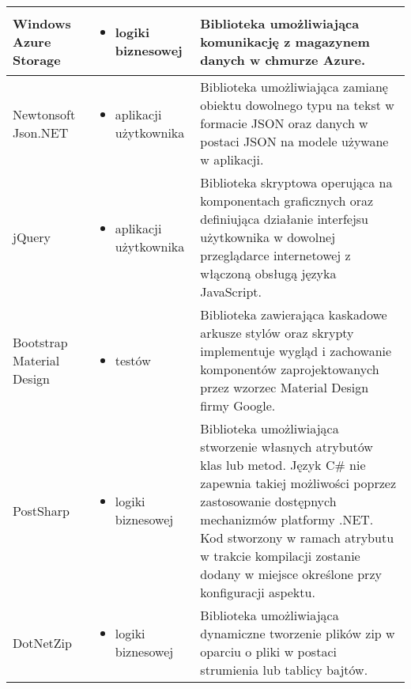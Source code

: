 \begin{center}
\begin{longtable}{ | p{2.2cm} | p{5cm} | p{6.5cm} |}
    \hline Windows Azure Storage &  
    \begin{itemize} 
    	\item logiki biznesowej
    \end{itemize} 
    & Biblioteka umożliwiająca komunikację z magazynem danych w chmurze Azure.\\ \hline
    
        \hline Newtonsoft Json.NET  &
        \begin{itemize} 
   			 \item aplikacji użytkownika
   		 \end{itemize}
    & Biblioteka umożliwiająca zamianę obiektu dowolnego typu  na tekst w formacie JSON oraz danych w postaci JSON na modele używane w aplikacji.		\\ \hline
    
    \hline jQuery &  
    \begin{itemize} 
    	\item aplikacji użytkownika
    \end{itemize} 
    & Biblioteka skryptowa operująca na komponentach graficznych oraz definiująca działanie interfejsu użytkownika w dowolnej przeglądarce internetowej z włączoną obsługą języka JavaScript. \\ \hline
    
    
    \hline Bootstrap Material Design &  
    \begin{itemize} 
    	\item testów
    \end{itemize} 
    & Biblioteka zawierająca kaskadowe arkusze stylów oraz skrypty implementuje wygląd i zachowanie komponentów zaprojektowanych przez wzorzec Material Design firmy Google. \\ \hline
    
    
    \hline PostSharp &  
    \begin{itemize} 
    	\item logiki biznesowej
    \end{itemize} 
    & Biblioteka umożliwiająca stworzenie własnych atrybutów klas lub metod. Język C\# nie zapewnia takiej możliwości poprzez zastosowanie dostępnych mechanizmów platformy .NET. Kod stworzony w ramach atrybutu w trakcie kompilacji zostanie dodany w miejsce określone przy konfiguracji aspektu. \\ \hline
    
      \hline DotNetZip &  
    \begin{itemize} 
    	\item logiki biznesowej
    \end{itemize} 
    & Biblioteka umożliwiająca dynamiczne tworzenie plików zip w oparciu o pliki w postaci strumienia lub tablicy bajtów. \\ \hline
    

\end{longtable}
\end{center}
